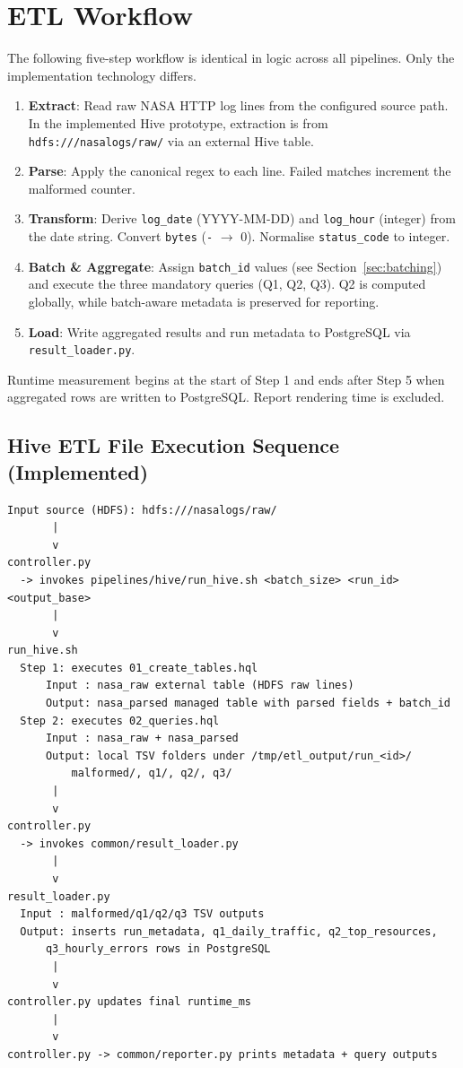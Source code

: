 \documentclass[12pt,a4paper]{article}
\begin{document}
\section{ETL Workflow}
The following five-step workflow is identical in logic across all pipelines. Only the implementation technology differs.

\begin{enumerate}
    \item \textbf{Extract}: Read raw NASA HTTP log lines from the configured source path. In the implemented Hive prototype, extraction is from \texttt{hdfs:///nasalogs/raw/} via an external Hive table.
    \item \textbf{Parse}: Apply the canonical regex to each line. Failed matches increment the malformed counter.
    \item \textbf{Transform}: Derive \texttt{log\_date} (YYYY-MM-DD) and \texttt{log\_hour} (integer) from the date string. Convert \texttt{bytes} (\texttt{-} $\rightarrow$ 0). Normalise \texttt{status\_code} to integer.
    \item \textbf{Batch \& Aggregate}: Assign \texttt{batch\_id} values (see Section~\ref{sec:batching}) and execute the three mandatory queries (Q1, Q2, Q3). Q2 is computed globally, while batch-aware metadata is preserved for reporting.
    \item \textbf{Load}: Write aggregated results and run metadata to PostgreSQL via \texttt{result\_loader.py}.
\end{enumerate}

Runtime measurement begins at the start of Step 1 and ends after Step 5 when aggregated rows are written to PostgreSQL. Report rendering time is excluded.

\subsection{Hive ETL File Execution Sequence (Implemented)}
\begin{verbatim}
Input source (HDFS): hdfs:///nasalogs/raw/
       |
       v
controller.py
  -> invokes pipelines/hive/run_hive.sh <batch_size> <run_id> <output_base>
       |
       v
run_hive.sh
  Step 1: executes 01_create_tables.hql
      Input : nasa_raw external table (HDFS raw lines)
      Output: nasa_parsed managed table with parsed fields + batch_id
  Step 2: executes 02_queries.hql
      Input : nasa_raw + nasa_parsed
      Output: local TSV folders under /tmp/etl_output/run_<id>/
          malformed/, q1/, q2/, q3/
       |
       v
controller.py
  -> invokes common/result_loader.py
       |
       v
result_loader.py
  Input : malformed/q1/q2/q3 TSV outputs
  Output: inserts run_metadata, q1_daily_traffic, q2_top_resources,
      q3_hourly_errors rows in PostgreSQL
       |
       v
controller.py updates final runtime_ms
       |
       v
controller.py -> common/reporter.py prints metadata + query outputs
\end{verbatim}
\end{document}
